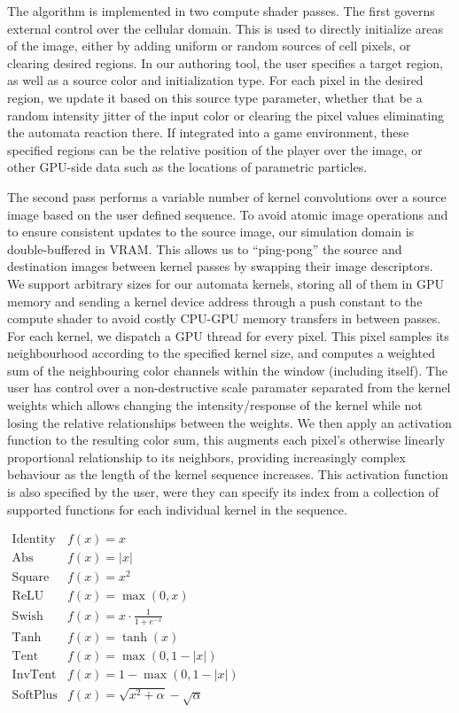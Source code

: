 \documentclass[twocolumn]{article}
\begin{document}
The algorithm is implemented in two compute shader passes. The first governs external control over the cellular domain. This is used to directly initialize areas of the image, either by adding uniform or random sources of cell pixels, or clearing desired regions. In our authoring tool, the user specifies a target region, as well as a source color and initialization type. For each pixel in the desired region, we update it based on this source type parameter, whether that be a random intensity jitter of the input color or clearing the pixel values eliminating the automata reaction there. If integrated into a game environment, these specified regions can be the relative position of the player over the image, or other GPU-side data such as the locations of parametric particles.

The second pass performs a variable number of kernel convolutions over a source image based on the user defined sequence.
To avoid atomic image operations and to ensure consistent updates to the source image, our simulation domain is double-buffered in VRAM. This allows us to ``ping-pong'' the source and destination images between kernel passes by swapping their image descriptors. We support arbitrary sizes for our automata kernels, storing all of them in GPU memory and sending a kernel device address through a push constant to the compute shader to avoid costly CPU-GPU memory transfers in between passes.
For each kernel, we dispatch a GPU thread for every pixel. This pixel samples its neighbourhood according to the specified kernel size, and computes a weighted sum of the neighbouring color channels within the window (including itself). The user has control over a non-destructive scale paramater separated from the kernel weights which allows changing the intensity/response of the kernel while not losing the relative relationships between the weights. We then apply an activation function to the resulting color sum, this augments each pixel's otherwise linearly proportional relationship to its neighbors, providing increasingly complex behaviour as the length of the kernel sequence increases. This activation function is also specified by the user, were they can specify its index from a collection of supported functions for each individual kernel in the sequence.

$
\begin{array}{ll}
\text{Identity} & f(x) = x  \\
\text{Abs} & f(x) = |x| \\
\text{Square} & f(x) = x^2  \\
\text{ReLU} & f(x) = \max(0, x) \\
\text{Swish} & f(x) = x \cdot \frac{1}{1 + e^{-x}}  \\
\text{Tanh} & f(x) = \tanh(x) \\
\text{Tent} & f(x) = \max(0, 1 - |x|) \\
\text{InvTent} & f(x) = 1 - \max(0, 1 - |x|)  \\
\text{SoftPlus} & f(x) = \sqrt{x^2 + \alpha} - \sqrt{\alpha}  \\
\end{array}
$
\end{document}
